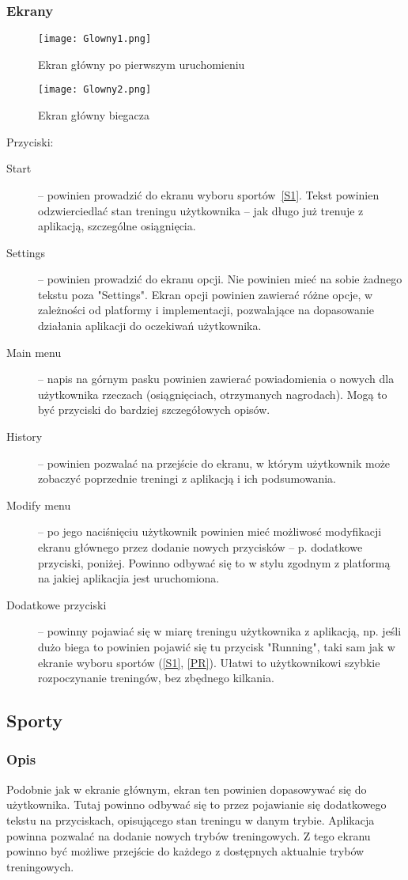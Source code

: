 \subsubsection{Ekrany}
\begin{figure}[b!]
  \texttt{[image: Glowny1.png]}
  \caption{Ekran główny po pierwszym uruchomieniu}
  \label{G1}
\end{figure}
\begin{figure}[b!]
  \texttt{[image: Glowny2.png]}
  \caption{Ekran główny biegacza}
  \label{G2}
\end{figure}
Przyciski:\\
\begin{description}
  \item[Start] -- powinien prowadzić do ekranu wyboru sportów~\ref{S1}. Tekst powinien odzwierciedlać stan treningu użytkownika -- jak długo już trenuje z aplikacją, szczególne osiągnięcia.
  \item[Settings] -- powinien prowadzić do ekranu opcji. Nie powinien mieć na sobie żadnego tekstu poza "Settings". Ekran opcji powinien zawierać różne opcje, w zależności od platformy i implementacji, pozwalające na dopasowanie działania aplikacji do oczekiwań użytkownika.
  \item[Main menu] -- napis na górnym pasku powinien zawierać powiadomienia o nowych dla użytkownika rzeczach (osiągnięciach, otrzymanych nagrodach). Mogą to być przyciski do bardziej szczegółowych opisów.
  \item[History] -- powinien pozwalać na przejście do ekranu, w którym użytkownik może zobaczyć poprzednie treningi z aplikacją i ich podsumowania.
  \item[Modify menu] -- po jego naciśnięciu użytkownik powinien mieć możliwosć modyfikacji ekranu głównego przez dodanie nowych przycisków -- p. dodatkowe przyciski, poniżej. Powinno odbywać się to w stylu zgodnym z platformą na jakiej aplikacjia jest uruchomiona.
  \item[Dodatkowe przyciski] -- powinny pojawiać się w miarę treningu użytkownika z aplikacją, np. jeśli dużo biega to powinien pojawić się tu przycisk "Running", taki sam jak w ekranie wyboru sportów (\ref{S1}, \ref{PR}). Ułatwi to użytkownikowi szybkie rozpoczynanie treningów, bez zbędnego kilkania.
\end{description}
\subsection{Sporty}
\subsubsection{Opis}
\noindent Podobnie jak w ekranie głównym, ekran ten powinien dopasowywać się do użytkownika. Tutaj powinno odbywać się to przez pojawianie się dodatkowego tekstu na przyciskach, opisującego stan treningu w danym trybie. Aplikacja powinna pozwalać na dodanie nowych trybów treningowych. Z tego ekranu powinno być możliwe przejście do każdego z dostępnych aktualnie trybów treningowych.
